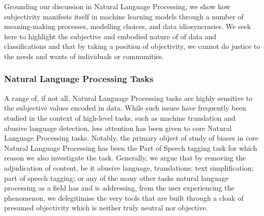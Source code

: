 Grounding our discussion in Natural Language Processing, we show how subjectivity manifests itself in machine learning models through a number of meaning-making processes, modelling choices, and data idiosyncrasies. We seek here to highlight the subjective and embodied nature of of data and classifications and that by taking a position of objectivity, we cannot do justice to the needs and wants of individuals or communities.

\subsubsection{Natural Language Processing Tasks}

A range of, if not all, Natural Language Processing tasks are highly sensitive to the subjective values encoded in data. While such issues have frequently been studied in the context of high-level tasks, such as machine translation and abusive language detection, less attention has been given to core Natural Language Processing tasks. Notably, the primary object of study of biases in core Natural Language Processing has been the Part of Speech tagging task \cite{Blodgett:2016,Jorgensen:2016} for which reason we also investigate the task.
Generally, we argue that by removing the adjudication of content, be it abusive language, translations; text simplification; part of speech tagging; or any of the many other tasks natural language processing as a field has and is addressing, from the user experiencing the phenomenon, we delegitimise the very tools that are built through a cloak of presumed objectivity which is neither truly neutral nor objective.

